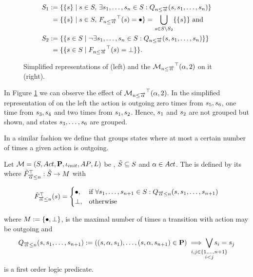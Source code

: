 \documentclass[preview]{standalone}
\begin{document}
\begin{align*}
	\states_1 &:= \{\{\state\} \mid \state \in \states,\, \exists \state_1, \dots, \state_\numoutact \in \states: \predminoutact\} \\
	&\;= \{\{\state\} \mid \state \in \states,\, \gfctminoutaction(\state) = \remelem\} = \nogroupstates \text{   and} \\
	\states_2 &:= \{\{\state \in \states \mid \lnot \exists \state_1, \dots, \state_\numoutact \in \states: \predminoutact\}\} \\
	&\;= \{\{\state \in \states \mid \gfctminoutaction(\state) = \notppty\}\}.
\end{align*}

\begin{figure}[h]
	\begin{minipage}{.5\textwidth}
		\hspace{5mm}
		
	\end{minipage}%
	\begin{minipage}{.5\textwidth}
		\hspace{5mm}
		
	\end{minipage}
	\caption{Simplified representations of \mdp (left) and the \viewN ${{{{{\mathcal{M}}}}_{{{n}\leq{\overrightarrow{\ensuremath{{\alpha}}}}}}}^{\top}}({\alpha},2)$ on it (right).}
	\label{fig:outActMinAfter}  
\end{figure}

In Figure \ref{fig:outActMinAfter} we can observe the effect of ${{{{{\mathcal{M}}}}_{{{n}\leq{\overrightarrow{\ensuremath{{\alpha}}}}}}}^{\top}}({\alpha},2)$. In the simplified representation of \achgphN on the left the action \action is outgoing zero times from ${s}_5, {s}_6$, one time from ${s}_3, {s}_4$ and two times from ${s}_1, {s}_2$. Hence, ${s}_1$ and ${s}_2$ are not grouped but shown, and states ${s}_3, \dots, {s}_6$ are grouped.

In a similar fashion we define \viewN that groups states where at most a certain number of times a given action is outgoing. 

\begin{definition}
	Let ${{{\mathcal{M}}}} = {{({S}, {Act}, {\textbf{P}}, {\iota_{init}}, {AP}, {L})}}$ be \achgphN, ${\tilde{{S}}} \subseteq {S}$ and ${\alpha} \in {Act}$. The \viewN \viewmaxoutaction is defined by its \grpfctN \gfctmaxoutaction where ${{\tilde{F}_{{{\overrightarrow{{\alpha}}}\leq{n}}}}^{\top}} : {\tilde{{S}}} \to {\ensuremath{{M}}}$ with

	\[
	{{\tilde{F}_{{{\overrightarrow{{\alpha}}}\leq{n}}}}^{\top}}({s}) =
	\begin{cases}
			{\bullet},				& \text{if } \forall {s}_1, \dots, {s}_{{n}+1} \in {S}: {Q_{{\overrightarrow{{\alpha}}}\leq{n}}({s},{s}_1, \dots, {s}_{{n}+1})} \\
			{\bot},          	& \text{otherwise}
		\end{cases}
	\]
	
	where ${{M}} := {\{{\bullet}, {\bot}\}}$,
	is the maximal number of times a transition with action \action may be outgoing and 
	\[
	\predmaxoutact := ((\state, \action, \state_1), \dots, (\state, \action, \state_{\numoutact+1}) \in \trans) \implies \bigvee_{\mathclap{\substack{i,j \in \{1,\dots, \numoutact+1\} \\ i < j}}} \state_i = \state_j
	\]
	is a first order logic predicate.
	\label{def:viewmaxoutaction}
\end{definition}
\end{document}
